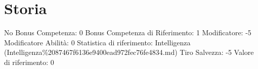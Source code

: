 \section{Storia}\label{storia}

\begin{description}
\tightlist
\item[Tags: ABI]
No Bonus Competenza: 0 Bonus Competenza di Riferimento: 1 Modificatore:
-5 Modificatore Abilità: 0 Statistica di riferimento: Intelligenza
(Intelligenza\%2087467f6136e9400ead972fec76fe4834.md) Tiro Salvezza: -5
Valore di riferimento: 0
\end{description}
